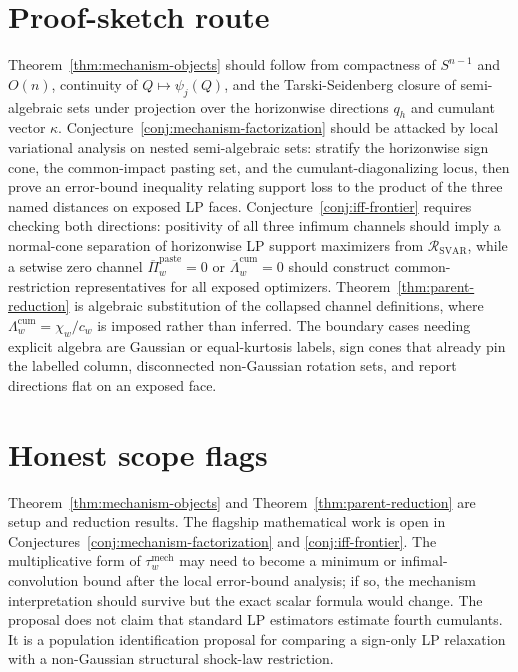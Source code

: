 \documentclass[11pt]{article}
\theoremstyle{definition}
\theoremstyle{plain}
\theoremstyle{remark}
\begin{document}
\section{Proof-sketch route}
Theorem~\ref{thm:mechanism-objects} should follow from compactness of \(S^{n-1}\) and \(O(n)\), continuity of \(Q\mapsto\psi_j(Q)\), and the Tarski-Seidenberg closure of semi-algebraic sets under projection over the horizonwise directions \(q_h\) and cumulant vector \(\kappa\).  Conjecture~\ref{conj:mechanism-factorization} should be attacked by local variational analysis on nested semi-algebraic sets: stratify the horizonwise sign cone, the common-impact pasting set, and the cumulant-diagonalizing locus, then prove an error-bound inequality relating support loss to the product of the three named distances on exposed LP faces.  Conjecture~\ref{conj:iff-frontier} requires checking both directions: positivity of all three infimum channels should imply a normal-cone separation of horizonwise LP support maximizers from \(\mathcal R_{\mathrm{SVAR}}\), while a setwise zero channel \(\overline\Pi_w^{\mathrm{paste}}=0\) or \(\overline\Lambda_w^{\mathrm{cum}}=0\) should construct common-restriction representatives for all exposed optimizers.  Theorem~\ref{thm:parent-reduction} is algebraic substitution of the collapsed channel definitions, where \(\Lambda_w^{\mathrm{cum}}=\chi_w/c_w\) is imposed rather than inferred.  The boundary cases needing explicit algebra are Gaussian or equal-kurtosis labels, sign cones that already pin the labelled column, disconnected non-Gaussian rotation sets, and report directions flat on an exposed face.

\section{Honest scope flags}
Theorem~\ref{thm:mechanism-objects} and Theorem~\ref{thm:parent-reduction} are setup and reduction results.  The flagship mathematical work is open in Conjectures~\ref{conj:mechanism-factorization} and \ref{conj:iff-frontier}.  The multiplicative form of \(\tau_w^{\mathrm{mech}}\) may need to become a minimum or infimal-convolution bound after the local error-bound analysis; if so, the mechanism interpretation should survive but the exact scalar formula would change.  The proposal does not claim that standard LP estimators estimate fourth cumulants.  It is a population identification proposal for comparing a sign-only LP relaxation with a non-Gaussian structural shock-law restriction.
\end{document}

